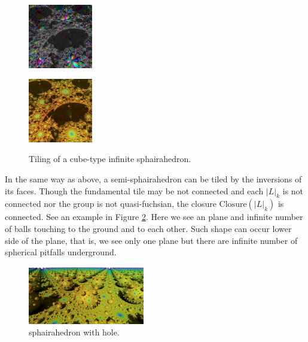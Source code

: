 \documentclass[suppldata, dvipdfmx]{interact}
\theoremstyle{plain}%
\theoremstyle{definition}
\theoremstyle{remark}
\theoremstyle{problemstyle}
\begin{document}
\begin{figure}[h!tbp]
\begin{minipage}[t]{0.18\textwidth}
  \label{}
 \end{minipage}
 \hspace*{\fill}
 \begin{minipage}[t]{0.18\textwidth}
  \centering
  \includegraphics[height=1.1in, keepaspectratio]{./img/constructFractal/terrainProcess/step10.jpg}
  \label{fig:terrainStep10}
 \end{minipage}
 \hspace*{\fill}
 \begin{minipage}[t]{0.18\textwidth}
  \centering
  \includegraphics[height=1.1in, keepaspectratio]{./img/constructFractal/terrainProcess/final.jpg}
  \label{fig:sphairaPrismFinal}
 \end{minipage}
 \caption{Tiling of a cube-type infinite sphairahedron.}
 \label{fig:sphairahedralPrismTile}
\end{figure}

In the same way as above, a semi-sphairahedron
can be tiled by the inversions of its faces.
Though the fundamental tile may be not connected and each $|L|_k$ is not connected nor the group is not quasi-fuchsian, the closure $\text{Closure}(|L|_k)$ is connected.  
See an example in Figure \ref{fig:semiSphairaSpheres}.  Here we see an plane and infinite number of balls touching to the ground and to each other.  Such shape can occur lower side of the plane, that is, we see only one plane but there are infinite number of spherical pitfalls underground.


\begin{figure}[h!tbp]
  \centering
 \includegraphics[width=2in,
 keepaspectratio]{./img/constructFractal/semi-terrain2.png}
 \caption{sphairahedron with hole.}
  \label{fig:semiSphairaSpheres}
\end{figure}
\end{document}
